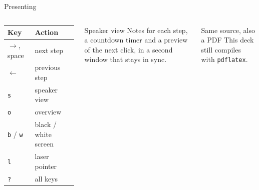 \documentclass{beamer}
\begin{document}
\begin{frame}[label=last]{Presenting}
  \begin{columns}[T]
      \begin{tabular}{ll}
        \toprule
        Key & Action \\
        \midrule
        $\rightarrow$, space & next step \\
        $\leftarrow$ & previous step \\
        \texttt{s} & speaker view \\
        \texttt{o} & overview \\
        \texttt{b} / \texttt{w} & black / white screen \\
        \texttt{l} & laser pointer \\
        \texttt{?} & all keys \\
        \bottomrule
      \end{tabular}
      \begin{exampleblock}{Speaker view}
        Notes for each step, a countdown timer and a preview of the next click,
        in a second window that stays in sync.
      \end{exampleblock}
      \begin{block}{Same source, also a PDF}
        This deck still compiles with \texttt{pdflatex}.
      \end{block}
  \end{columns}
\end{frame}
\end{document}
